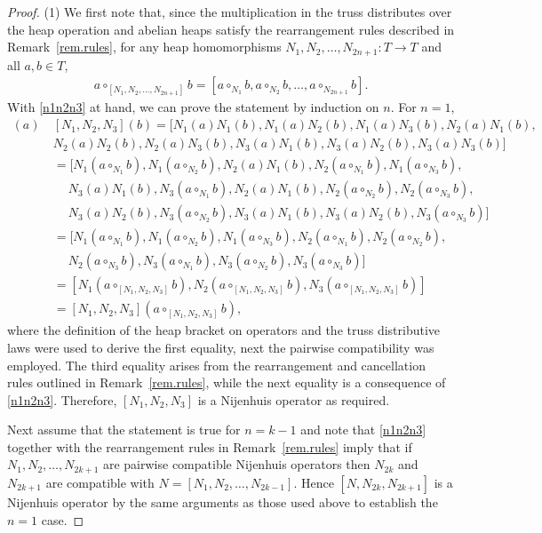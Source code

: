 \documentclass[10pt,a4paper]{amsart}
\numberwithin{equation}{section}
\begin{document}
\begin{proof}
 (1) We first note that, since the multiplication in the truss distributes over the heap operation and abelian heaps satisfy the rearrangement rules described in Remark~\ref{rem.rules}, for any heap homomorphisms $N_1, N_2,\dots ,N_{2n+1}\colon T\to T$ and all $a,b\in T$,
 \begin{gather}\label{n1n2n3}
 a\circ_{[N_1,N_2,\dots, N_{2n+1}]} b = [ a\circ_{N_1} b, a\circ_{N_2} b,\dots, a\circ_{N_{2n+1}} b].
 \end{gather}
 With \eqref{n1n2n3} at hand, we can prove the statement by induction on $n$. For $n=1$,
 \begin{align*}
 [N_1,N_2,N_3](a)\ &[N_1,N_2,N_3](b) = [N_1(a)N_1(b), N_1(a)N_2(b), N_1(a)N_3(b),
 N_2(a)N_1(b), \\ & N_2(a)N_2(b),
 N_2(a)N_3(b),
 N_3(a)N_1(b), N_3(a)N_2(b), N_3(a)N_3(b)]\\
 &= [N_1(a\circ_{N_1}b), N_1(a\circ_{N_2}b),N_2(a)N_1(b), N_2(a\circ_{N_1}b),
 N_1(a\circ_{N_3}b),\\
 &\quad\ N_3(a)N_1(b), N_3(a\circ_{N_1}b), N_2(a)N_1(b), N_2(a\circ_{N_2}b), N_2(a\circ_{N_3}b),\\
 &\quad\ N_3(a)N_2(b),N_3(a\circ_{N_2}b), N_3(a)N_1(b), N_3(a)N_2(b), N_3(a\circ_{N_3}b)]\\
 &= [N_1(a\circ_{N_1}b), N_1(a\circ_{N_2}b),N_1(a\circ_{N_3}b), N_2(a\circ_{N_1}b), N_2(a\circ_{N_2}b),
 \\
 &\quad\ N_2(a\circ_{N_3}b), N_3(a\circ_{N_1}b),N_3(a\circ_{N_2}b), N_3(a\circ_{N_3}b)]\\
 &= [N_1(a\circ_{[N_1,N_2,N_3]} b), N_2(a\circ_{[N_1,N_2,N_3]} b), N_3(a\circ_{[N_1,N_2,N_3]} b)]\\
 &= [N_1,N_2,N_3](a\circ_{[N_1,N_2,N_3]} b),
 \end{align*}
 where the definition of the heap bracket on operators and the truss distributive laws were used to derive the first equality, next the pairwise compatibility was employed. The third equality arises from the rearrangement and cancellation rules outlined in Remark~\ref{rem.rules}, while the next equality is a consequence of \eqref{n1n2n3}. Therefore, $[N_1,N_2,N_3]$ is a Nijenhuis operator as required.

 Next assume that the statement is true for $n=k-1$ and note that \eqref{n1n2n3} together with the rearrangement rules in Remark~\ref{rem.rules} imply that if $N_1,N_2,\dots, N_{2k+1}$ are pairwise compatible Nijenhuis operators then $N_{2k}$ and $N_{2k+1}$ are compatible with $N=[N_1,N_2,\dots, N_{2k-1}]$. Hence $[N, N_{2k},N_{2k+1}]$ is a Nijenhuis operator by the same arguments as those used above to establish the $n=1$ case.


\end{proof}
\end{document}
